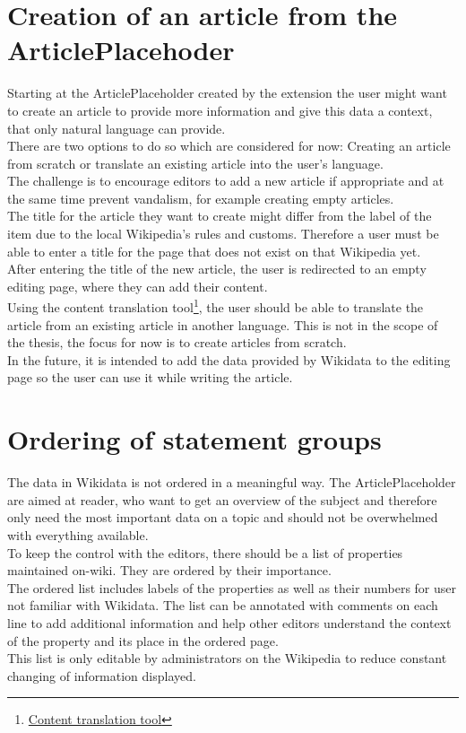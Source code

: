 \section{Creation of an article from the ArticlePlacehoder}
Starting at the ArticlePlaceholder created by the extension the user might want to create an article to provide more information and give this data a context, that only natural language can provide. \\
There are two options to do so which are considered for now: Creating an article from scratch or translate an existing article into the user's language. \\
The challenge is to encourage editors to add a new article if appropriate and at the same time prevent vandalism, for example creating empty articles. \\ 
The title for the article they want to create might differ from the label of the item due to the local Wikipedia's rules and customs. Therefore a user must be able to enter a title for the page that does not exist on that Wikipedia yet. \\
After entering the title of the new article, the user is redirected to an empty editing page, where they can add their content. \\
Using the content translation tool\footnote{\href{https://www.mediawiki.org/wiki/Content_translation}{Content translation tool}}, the user should be able to translate the article from an existing article in another language. This is not in the scope of the thesis, the focus for now is to create articles from scratch. \\
In the future, it is intended to add the data provided by Wikidata to the editing page so the user can use it while writing the article. 

\section{Ordering of statement groups}
The data in Wikidata is not ordered in a meaningful way. The ArticlePlaceholder are aimed at reader, who want to get an overview of the subject and therefore only need the most important data on a topic and should not be overwhelmed with everything available. 
\\
To keep the control with the editors, there should be a list of properties maintained on-wiki. They are ordered by their importance. \\
The ordered list includes labels of the properties as well as their numbers for user not familiar with Wikidata. The list can be annotated with comments on each line to add additional information and help other editors understand the context of the property and its place in the ordered page. \\
This list is only editable by administrators on the Wikipedia to reduce constant changing of information displayed. 

